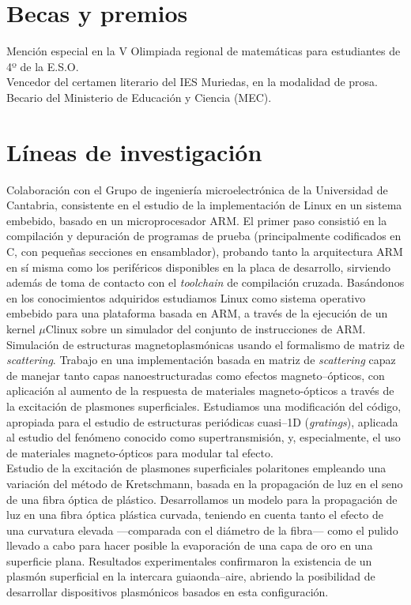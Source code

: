 \documentclass[11pt, a4paper]{article}
\newcommand{\years}[1]{\marginnote{\scriptsize #1}}
\begin{document}
\section*{Becas y premios} %
\noindent
\years{2001}Mención especial en la V Olimpiada regional de matemáticas para estudiantes de 4º de la E.S.O.\\
\years{2005}Vencedor del certamen literario del IES Muriedas, en la modalidad de prosa.\\
\years{2006-2010}Becario del Ministerio de Educación y Ciencia (MEC).


\section*{Líneas de investigación} %
\noindent
\years{2005-2008}Colaboración con el Grupo de ingeniería microelectrónica de la Universidad de Cantabria, consistente en el estudio de la implementación de Linux en un sistema embebido, basado en un microprocesador ARM. El primer paso consistió en la compilación y depuración de programas de prueba (principalmente codificados en C, con pequeñas secciones en ensamblador), probando tanto la arquitectura ARM en sí misma como los periféricos disponibles en la placa de desarrollo, sirviendo además de toma de contacto con el \emph{toolchain} de compilación cruzada. Basándonos en los conocimientos adquiridos estudiamos Linux como sistema operativo embebido para una plataforma basada en ARM, a través de la ejecución de un kernel $\mu$Clinux sobre un simulador del conjunto de instrucciones de ARM.\\
\years{2008-2009}Simulación de estructuras magnetoplasmónicas usando el formalismo de matriz de \emph{scattering}. Trabajo en una implementación basada en matriz de \emph{scattering} capaz de manejar tanto capas nanoestructuradas como efectos magneto--ópticos, con aplicación al aumento de la respuesta de materiales magneto-ópticos a través de la excitación de plasmones superficiales. Estudiamos una modificación del código, apropiada para el estudio de estructuras periódicas cuasi--1D (\emph{gratings}), aplicada al estudio del fenómeno conocido como supertransmisión, y, especialmente, el uso de materiales magneto-ópticos para modular tal efecto.\\
\years{2009-presente}Estudio de la excitación de plasmones superficiales polaritones empleando una variación del método de Kretschmann, basada en la propagación de luz en el seno de una fibra óptica de plástico. Desarrollamos un modelo para la propagación de luz en una fibra óptica plástica curvada, teniendo en cuenta tanto el efecto de una curvatura elevada ---comparada con el diámetro de la fibra--- como el pulido llevado a cabo para hacer posible la evaporación de una capa de oro en una superficie plana. Resultados experimentales confirmaron la existencia de un plasmón superficial en la intercara guiaonda--aire, abriendo la posibilidad de desarrollar dispositivos plasmónicos basados en esta configuración.\\
\end{document}
